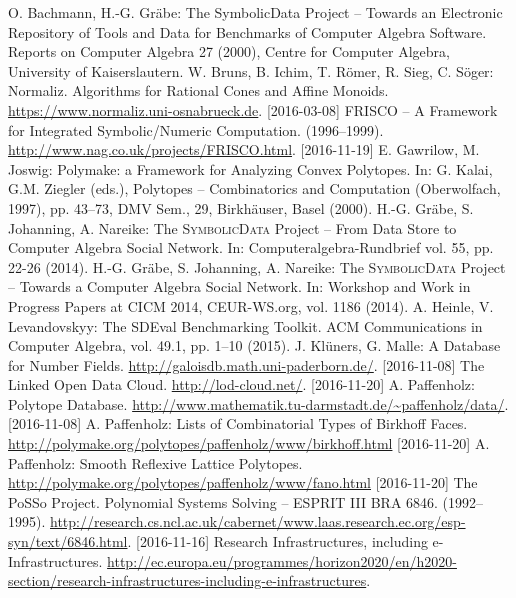 \documentclass{mathincs}
\newcommand{\SD}{\textsc{Symbo\-lic\-Data}}
\begin{document}
\begin{thebibliography}{00}
\setlength{\itemsep}{-1mm}
\footnotesize
{} O. Bachmann, H.-G. Gr\"abe: The SymbolicData Project --
  Towards an Electronic Repository of Tools and Data for Benchmarks of Computer
  Algebra Software. Reports on Computer Algebra 27 (2000), Centre for Computer
  Algebra, University of Kaiserslautern.
 W. Bruns, B. Ichim, T. R\"omer, R. Sieg, C. S\"oger:
  Normaliz.  Algorithms for Rational Cones and Affine Monoids.
  \url{https://www.normaliz.uni-osnabrueck.de}. [2016-03-08]
 FRISCO -- A Framework for Integrated Symbolic/Numeric
  Computation. (1996--1999).  \url{http://www.nag.co.uk/projects/FRISCO.html}.
  [2016-11-19]
 E. Gawrilow, M. Joswig: Polymake: a Framework for Analyzing
  Convex Polytopes. In: G. Kalai, G.M. Ziegler (eds.), Polytopes --
  Combinatorics and Computation (Oberwolfach, 1997), pp. 43--73, DMV Sem., 29,
  Birkh\"auser, Basel (2000).
 H.-G. Gr\"abe, S. Johanning, A. Nareike: The {\SD} Project --
  From Data Store to Computer Algebra Social Network. In:
  Computeralgebra-Rundbrief vol. 55, pp. 22-26 (2014).
 H.-G. Gr\"abe, S. Johanning, A. Nareike: The {\SD} Project --
  Towards a Computer Algebra Social Network. In: Workshop and Work in Progress
  Papers at CICM 2014, CEUR-WS.org, vol. 1186 (2014).
 A. Heinle, V. Levandovskyy: The SDEval Benchmarking
  Toolkit. ACM Communications in Computer Algebra, vol. 49.1, pp. 1--10 (2015).
 J. Kl\"uners, G. Malle: A Database for Number Fields.
  \url{http://galoisdb.math.uni-paderborn.de/}. [2016-11-08]
 The Linked Open Data Cloud.  \url{http://lod-cloud.net/}.
  [2016-11-20]
 A. Paffenholz: Polytope Database.
  \url{http://www.mathematik.tu-darmstadt.de/~paffenholz/data/}.  [2016-11-08]
 A. Paffenholz: Lists of Combinatorial Types of Birkhoff
  Faces.  \url{http://polymake.org/polytopes/paffenholz/www/birkhoff.html}
  [2016-11-20]
 A. Paffenholz: Smooth Reflexive Lattice Polytopes.
  \url{http://polymake.org/polytopes/paffenholz/www/fano.html} [2016-11-20]
 The PoSSo Project. Polynomial Systems Solving -- ESPRIT III BRA
  6846.  (1992--1995).
  \url{http://research.cs.ncl.ac.uk/cabernet/www.laas.research.ec.org/esp-syn/text/6846.html}. 
      [2016-11-16]
 Research Infrastructures, including e-Infrastructures.
  \url{http://ec.europa.eu/programmes/horizon2020/en/h2020-section/research-infrastructures-including-e-infrastructures}.

\end{thebibliography}
\end{document}
